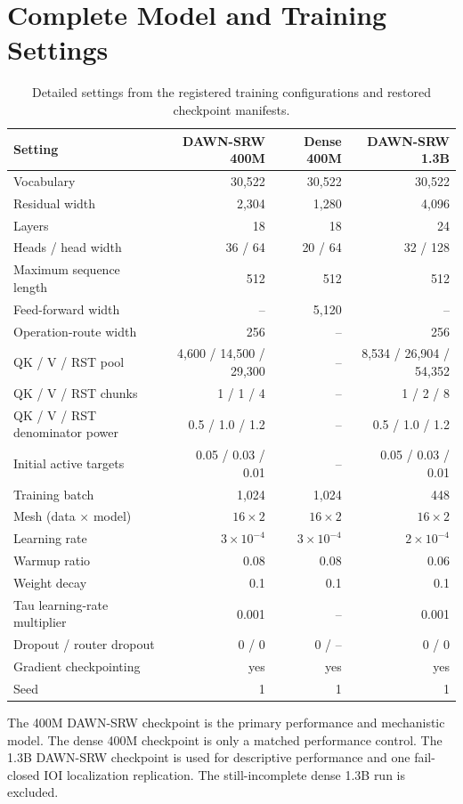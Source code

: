 \documentclass{article}
\newcommand{\DAWN}{DAWN-SRW}
\begin{document}
\section{Complete Model and Training Settings}
\label{app:settings}

\begin{table}[h]
\centering
\caption{Detailed settings from the registered training configurations and
restored checkpoint manifests.}
\small
\begin{tabular}{lrrr}
\toprule
Setting & \DAWN{} 400M & Dense 400M & \DAWN{} 1.3B\\
\midrule
Vocabulary & 30,522 & 30,522 & 30,522\\
Residual width & 2,304 & 1,280 & 4,096\\
Layers & 18 & 18 & 24\\
Heads / head width & 36 / 64 & 20 / 64 & 32 / 128\\
Maximum sequence length & 512 & 512 & 512\\
Feed-forward width & -- & 5,120 & --\\
Operation-route width & 256 & -- & 256\\
QK / V / RST pool & 4,600 / 14,500 / 29,300 & -- &
8,534 / 26,904 / 54,352\\
QK / V / RST chunks & 1 / 1 / 4 & -- & 1 / 2 / 8\\
QK / V / RST denominator power & 0.5 / 1.0 / 1.2 & -- &
0.5 / 1.0 / 1.2\\
Initial active targets & 0.05 / 0.03 / 0.01 & -- &
0.05 / 0.03 / 0.01\\
Training batch & 1,024 & 1,024 & 448\\
Mesh (data \(\times\) model) & \(16\times2\) & \(16\times2\) & \(16\times2\)\\
Learning rate & \(3\times10^{-4}\) & \(3\times10^{-4}\) & \(2\times10^{-4}\)\\
Warmup ratio & 0.08 & 0.08 & 0.06\\
Weight decay & 0.1 & 0.1 & 0.1\\
Tau learning-rate multiplier & 0.001 & -- & 0.001\\
Dropout / router dropout & 0 / 0 & 0 / -- & 0 / 0\\
Gradient checkpointing & yes & yes & yes\\
Seed & 1 & 1 & 1\\
\bottomrule
\end{tabular}
\end{table}

The 400M \DAWN{} checkpoint is the primary performance and mechanistic model.
The dense 400M checkpoint is only a matched performance control. The 1.3B
\DAWN{} checkpoint is used for descriptive performance and one fail-closed IOI
localization replication. The still-incomplete dense 1.3B run is excluded.
\end{document}
